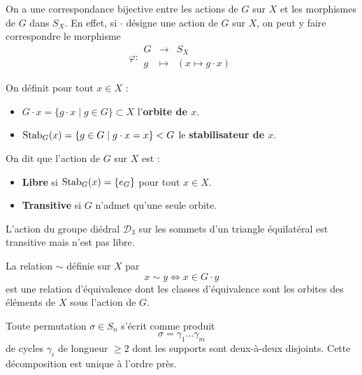 	\begin{theorem}
		On a une correspondance bijective entre les actions de $G$ sur $X$ et les morphismes de $G$ dans $S_X$. En effet, si $\cdot$ désigne une action de $G$ sur $X$, on peut y faire correspondre le morphisme
		\[ \varphi :
		\begin{array}{ccc}
			G &\rightarrow& S_X \\
			g &\mapsto& (x \mapsto g \cdot x)
		\end{array}
		\]
	\end{theorem}

	\begin{definition}
		On définit pour tout $x \in X$ :
		\begin{itemize}
			\item $G \cdot x = \{ g \cdot x \mid g \in G \} \subset X$ l'\textbf{orbite de $x$}.
			\item $\operatorname{Stab}_G(x) = \{ g \in G \mid g \cdot x = x \} < G$ le \textbf{stabilisateur de $x$}.
		\end{itemize}
		On dit que l'action de $G$ sur $X$ est :
		\begin{itemize}
			\item \textbf{Libre} si $\operatorname{Stab}_G(x) = \{ e_G \}$ pour tout $x \in X$.
			\item \textbf{Transitive} si $G$ n'admet qu'une seule orbite.
		\end{itemize}
	\end{definition}

	\begin{example}
		L'action du groupe diédral $\mathcal{D}_3$ sur les sommets d'un triangle équilatéral est transitive mais n'est pas libre.
	\end{example}

	\begin{proposition}
		\label{101-1}
		La relation $\sim$ définie sur $X$ par
		\[ x \sim y \iff x \in G \cdot y \]
		est une relation d'équivalence dont les classes d'équivalence sont les orbites des éléments de $X$ sous l'action de $G$.
	\end{proposition}


	\begin{application}
		Toute permutation $\sigma \in S_n$ s'écrit comme produit
		\[ \sigma = \gamma_1 \dots \gamma_m \]
		de cycles $\gamma_i$ de longueur $\geq 2$ dont les supports sont deux-à-deux disjoints. Cette décomposition est unique à l'ordre près.
	\end{application}

